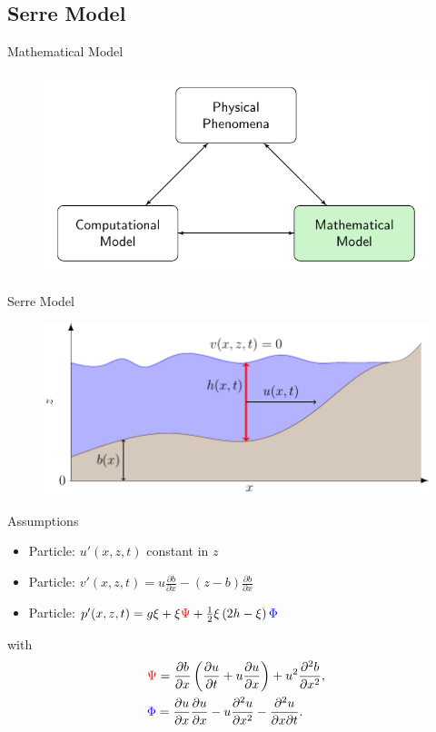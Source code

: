 \documentclass[handout]{beamer}
\begin{document}
\subsection{Serre Model}
\begin{frame}{Mathematical Model}
	\begin{figure}
		\includegraphics[width=\textwidth]{./Pics/ModelDiagrams/FlowChartHigh2G.pdf}
	\end{figure}
\end{frame}
\begin{frame}{Serre Model}
	\begin{figure}
		\includegraphics[width=\textwidth]{./Pics/WaterModelDiagrams/SWWE.pdf}
	\end{figure}
\end{frame}
\begin{frame}{Assumptions}
	\begin{itemize}
		\pause
		\item Particle: $u'(x,z,t)$ constant in $z$
		\pause
		\item Particle: $v'(x,z,t) = u\frac{\partial b}{\partial x} - (z - b)\frac{\partial b}{\partial x}$
		\pause
		\item Particle: $p'(x,z,t) = g\xi  + \xi { \color{red}\Psi } + \frac{1}{2} \xi \left(2h - \xi\right) { \color{blue} \Phi }$
	\end{itemize}
		with
		\begin{align*}
		&{ \color{red}\Psi }  = \dfrac{\partial b}{\partial x}\left(\dfrac{\partial u}{\partial t} + u\dfrac{\partial u}{\partial x} \right)  + u^2\dfrac{\partial^2 b}{\partial x^2}, \\&
		{ \color{blue} \Phi }  = \dfrac{\partial u }{\partial x} \dfrac{\partial u}{\partial x} -u \dfrac{\partial^2 u}{\partial x^2}  - \dfrac{\partial^2 u}{\partial x \partial t} .
		\end{align*}
\end{frame}
\end{document}
